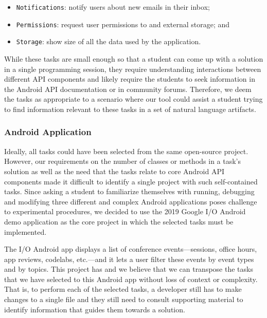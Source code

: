 


\begin{itemize}
    \item \texttt{Notifications}: notify users about new emails in their inbox;
    \item \texttt{Permissions}: request user permissions to and external storage; and
    \item \texttt{Storage}: show size of all the data used by the application.
\end{itemize}


While these tasks are small enough so that a student can come up with a solution in a single programming session,
they require understanding interactions between different API components 
and likely require the students to seek information in the Android API documentation or in community forums. 
Therefore, we deem the tasks as appropriate to a scenario where our tool could assist a student trying to find information relevant to these tasks in a set of natural language artifacts. 


\subsubsection{Android Application}


Ideally, all tasks could have been selected from the same open-source project. However, our requirements on the number of classes or methods in a task's solution as well as the need that the tasks relate to core Android API components made it difficult 
to identify a single project with such self-contained tasks. Since asking a student to familiarize themselves with running, debugging and modifying three different and complex Android applications 
poses challenge to experimental procedures, we decided to use the 2019 Google I/O Android demo application as the core project in which the selected tasks must be implemented. 


The I/O Android app displays a list of conference events---sessions, office hours, app reviews, codelabs, etc.---and it lets a user filter these events by event types and by topics.
This project has  and we believe that we can transpose the tasks that we have selected to this Android app without loss of context or complexity. 
That is, to perform each of the selected tasks, a developer still has to make changes to a single file and they still need to consult supporting material to identify information that guides them towards 
a solution.






